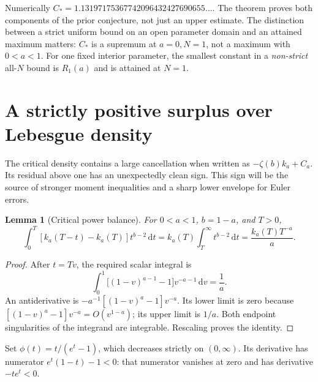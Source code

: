 \documentclass[11pt]{article}
\numberwithin{equation}{section}
\newtheorem{lemma}[theorem]{Lemma}
\theoremstyle{definition}\newtheorem{definition}[theorem]{Definition}
\theoremstyle{remark}\newtheorem{remark}[theorem]{Remark}
\newcommand{\dd}{\,\mathrm d}
\newcommand{\Cstar}{C_*}
\begin{document}
Numerically $\Cstar=1.13197175367742096432427690655\ldots$.
The theorem proves both components of the prior conjecture, not just an
upper estimate. The distinction between a strict uniform bound on an
open parameter domain and an attained maximum matters: $\Cstar$ is a
supremum at $a=0,N=1$, not a maximum with $0<a<1$.
For one fixed interior parameter, the smallest constant in a
\emph{non-strict} all-$N$ bound is $R_1(a)$ and is attained at $N=1$.

\section{A strictly positive surplus over Lebesgue density}
\label{sec:surplus}
The critical density contains a large cancellation when written as
$-\zeta(b)k_a+C_a$. Its residual above one has an unexpectedly clean
sign. This sign will be the source of stronger moment inequalities and
a sharp lower envelope for Euler errors.

\begin{lemma}[Critical power balance]\label{lem:balance}
For $0<a<1$, $b=1-a$, and $T>0$,
\begin{equation}\label{eq:balance}
 \int_0^T[k_a(T-t)-k_a(T)]t^{b-2}\dd t
 =k_a(T)\int_T^\infty t^{b-2}\dd t
 =\frac{k_a(T)T^{-a}}a.
\end{equation}
\end{lemma}
\begin{proof}
After $t=Tv$, the required scalar integral is
\[
 \int_0^1\bigl[(1-v)^{a-1}-1\bigr]v^{-a-1}\dd v=\frac1a.
\]
An antiderivative is
$-a^{-1}[(1-v)^a-1]v^{-a}$. Its lower limit is zero because
$[(1-v)^a-1]v^{-a}=O(v^{1-a})$; its upper limit is $1/a$.
Both endpoint singularities of the integrand are integrable.
Rescaling proves the identity.
\end{proof}

Set $\phi(t)=t/(e^t-1)$, which decreases strictly on $(0,\infty)$.
Its derivative has numerator $e^t(1-t)-1<0$: that numerator vanishes
at zero and has derivative $-te^t<0$.
\end{document}
